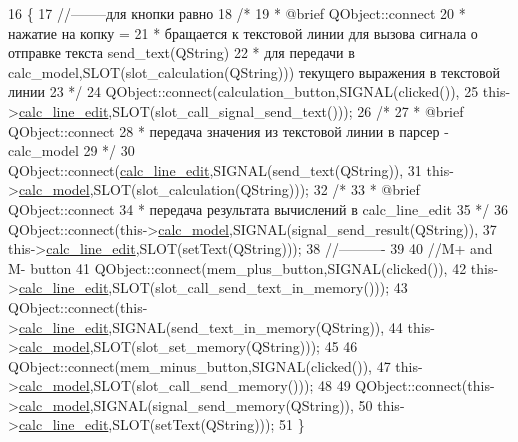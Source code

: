 \begin{DoxyCode}
16 \{
17     \textcolor{comment}{//--------для кнопки равно}
18     \textcolor{comment}{/*}
19 \textcolor{comment}{     * @brief QObject::connect}
20 \textcolor{comment}{     * нажатие на копку =}
21 \textcolor{comment}{     * бращается к текстовой линии для вызова сигнала о отправке текста send\_text(QString)}
22 \textcolor{comment}{     * для передачи в calc\_model,SLOT(slot\_calculation(QString))) текущего выражения в текстовой линии}
23 \textcolor{comment}{     */}
24     QObject::connect(calculation\_button,SIGNAL(clicked()),
25                      this->\hyperlink{classControl_ae666eb91a7f9f964a07e779798cd18c8}{calc\_line\_edit},SLOT(slot\_call\_signal\_send\_text()));
26     \textcolor{comment}{/*}
27 \textcolor{comment}{     * @brief QObject::connect}
28 \textcolor{comment}{     * передача значения из текстовой линии в парсер - calc\_model}
29 \textcolor{comment}{     */}
30     QObject::connect(\hyperlink{classControl_ae666eb91a7f9f964a07e779798cd18c8}{calc\_line\_edit},SIGNAL(send\_text(QString)),
31                      this->\hyperlink{classControl_a249421d8ef527bd40991b557daec911c}{calc\_model},SLOT(slot\_calculation(QString)));
32     \textcolor{comment}{/*}
33 \textcolor{comment}{     * @brief QObject::connect}
34 \textcolor{comment}{     * передача результата вычислений в calc\_line\_edit}
35 \textcolor{comment}{     */}
36     QObject::connect(this->\hyperlink{classControl_a249421d8ef527bd40991b557daec911c}{calc\_model},SIGNAL(signal\_send\_result(QString)),
37                      this->\hyperlink{classControl_ae666eb91a7f9f964a07e779798cd18c8}{calc\_line\_edit},SLOT(setText(QString)));
38     \textcolor{comment}{//----------}
39 
40     \textcolor{comment}{//M+ and M- button}
41     QObject::connect(mem\_plus\_button,SIGNAL(clicked()),
42                      this->\hyperlink{classControl_ae666eb91a7f9f964a07e779798cd18c8}{calc\_line\_edit},SLOT(slot\_call\_send\_text\_in\_memory()));
43     QObject::connect(this->\hyperlink{classControl_ae666eb91a7f9f964a07e779798cd18c8}{calc\_line\_edit},SIGNAL(send\_text\_in\_memory(QString)),
44                      this->\hyperlink{classControl_a249421d8ef527bd40991b557daec911c}{calc\_model},SLOT(slot\_set\_memory(QString)));
45 
46     QObject::connect(mem\_minus\_button,SIGNAL(clicked()),
47                      this->\hyperlink{classControl_a249421d8ef527bd40991b557daec911c}{calc\_model},SLOT(slot\_call\_send\_memory()));
48 
49     QObject::connect(this->\hyperlink{classControl_a249421d8ef527bd40991b557daec911c}{calc\_model},SIGNAL(signal\_send\_memory(QString)),
50                      this->\hyperlink{classControl_ae666eb91a7f9f964a07e779798cd18c8}{calc\_line\_edit},SLOT(setText(QString)));
51 \}
\end{DoxyCode}
\hypertarget{classControl_aba9a456fd0d24c077a1fae770af7762c}{}

